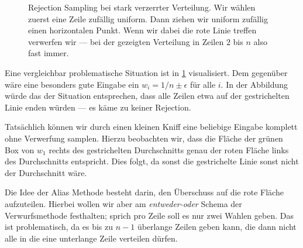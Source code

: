 \begin{figure}
    \begin{center}
        \def\w{5cm}
        \def\h{5mm}
    \end{center}
    \caption{
        Rejection Sampling bei stark verzerrter Verteilung.
        Wir wählen zuerst eine Zeile zufällig uniform.
        Dann ziehen wir uniform zufällig einen horizontalen Punkt.
        Wenn wir dabei die rote Linie treffen verwerfen wir --- bei der gezeigten Verteilung in Zeilen $2$ bis $n$ also fast immer.
    }
    \label{fig:alias-tab-motivation}
\end{figure}

Eine vergleichbar problematische Situation ist in \cref{fig:alias-tab-motivation} visualisiert.
Dem gegenüber wäre eine besonders gute Eingabe ein $w_i = 1/n \pm \epsilon$ für alle $i$.
In der Abbildung würde das der Situation entsprechen, dass alle Zeilen etwa auf der gestrichelten Linie enden würden --- es käme zu keiner Rejection.

Tatsächlich können wir durch einen kleinen Kniff eine beliebige Eingabe komplett ohne Verwerfung samplen.
Hierzu beobachten wir, dass die Fläche der grünen Box von $w_1$ rechts des gestrichelten Durchschnitts genau der roten Fläche links des Durchschnitts entspricht.
Dies folgt, da sonst die gestrichelte Linie sonst nicht der Durchschnitt wäre.

Die Idee der Alias Methode besteht darin, den Überschuss auf die rote Fläche aufzuteilen.
Hierbei wollen wir aber am \emph{entweder-oder} Schema der Verwurfsmethode festhalten;
sprich pro Zeile soll es nur zwei Wahlen geben.
Das ist problematisch, da es bis zu $n-1$ überlange Zeilen geben kann, die dann nicht alle in die eine unterlange Zeile verteilen dürfen.

